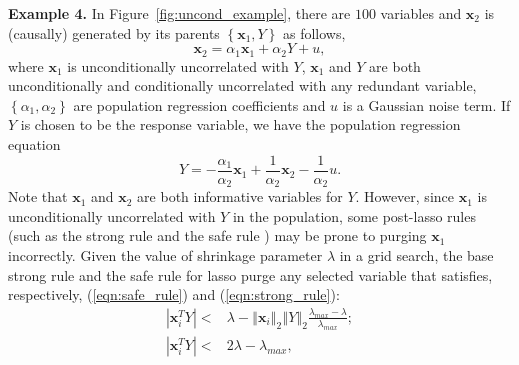 \documentclass[12pt]{article}
\begin{document}
\smallskip
\noindent
\textbf{Example 4.} In Figure~\ref{fig:uncond_example}, there are $100$ variables and $\mathbf{x}_2$ is (causally) generated by its parents $\left\{ \mathbf{x}_1, Y \right\}$ as follows,
%
\begin{equation}
  \mathbf{x}_2 = \alpha_1 \mathbf{x}_1 + \alpha_2 Y + u,
  \label{eqn:collider_1}
\end{equation}
%
where $\mathbf{x}_1$ is unconditionally uncorrelated with $Y$, $\mathbf{x}_1$ and $Y$ are both unconditionally and conditionally uncorrelated with any redundant variable, $\left\{\alpha_1, \alpha_2 \right\}$ are population regression coefficients and $u$ is a Gaussian noise term. If $Y$ is chosen to be the response variable, we have the population regression equation
%
\begin{equation}
  Y = -\frac{\alpha_1}{\alpha_2} \mathbf{x}_1 + \frac{1}{\alpha_2} \mathbf{x}_2 - \frac{1}{\alpha_2}u.
  \label{eqn:collider_2}
\end{equation}
%
Note that $\mathbf{x}_1$ and $\mathbf{x}_2$ are both informative variables for $Y$. However, since $\mathbf{x}_1$ is unconditionally uncorrelated with $Y$ in the population, some post-lasso rules (such as the strong rule \citep{tibshirani2012strong} and the safe rule \citep{ghaoui2010safe}) may be prone to purging $\mathbf{x}_1$ incorrectly. Given the value of shrinkage parameter $\lambda$ in a grid search, the base strong rule and the safe rule for lasso purge any selected variable that satisfies, respectively, (\ref{eqn:safe_rule}) and (\ref{eqn:strong_rule}):
%
\begin{eqnarray}
  \left\vert \mathbf{x}_i^T Y \right\vert < & \lambda - \left\Vert \mathbf{x}_i \right\Vert_2 \left\Vert Y \right\Vert_2 \frac{\lambda_{max} - \lambda} {\lambda_{max}} ; \label{eqn:safe_rule} \\
  \left\vert \mathbf{x}_i^T Y \right\vert < & 2\lambda - \lambda_{max} , \label{eqn:strong_rule}
  \label{eqn:post_estmation_rule}
\end{eqnarray}
%
\end{document}
